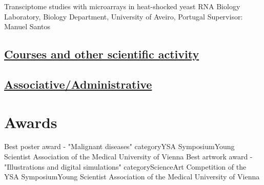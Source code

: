 \documentclass[11pt,a4paper,roman]{moderncv} %
\begin{document}
            {Transciptome studies with microarrays in heat-shocked yeast}
            {RNA Biology Laboratory, Biology Department, University of Aveiro, Portugal}{}
            {}
            {Supervisor: Manuel Santos}

    \subsection{\underline{Courses and other scientific activity}}

    \subsection{\underline{Associative/Administrative}}



\section{Awards}

        {Best poster award - "Malignant diseases" category}{YSA Symposium}{}{}{Young Scientist Association of the Medical University of Vienna}
        {Best artwork award - "Illustrations and digital simulations" category}{ScienceArt Competition of the YSA Symposium}{}{}{Young Scientist Association of the Medical University of Vienna}
\end{document}

